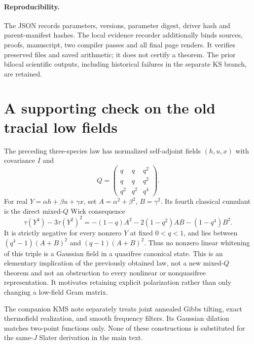 \documentclass[11pt]{article}
\begin{document}
\paragraph{Reproducibility.}
The JSON records parameters, versions, parameter digest, driver hash
and parent-manifest hashes. The local evidence recorder additionally
binds sources, proofs, manuscript, two compiler passes and all final
page renders. It verifies preserved files and saved arithmetic; it
does not certify a theorem. The prior bilocal scientific outputs,
including historical failures in the separate KS branch, are retained.

\newpage
\appendix
\section{A supporting check on the old tracial low fields}
The preceding three-species law has normalized self-adjoint fields
$(h,u,x)$ with covariance $I$ and
\begin{equation}
 Q=\begin{pmatrix}q&q&q^2\\q&q&q^2\\q^2&q^2&q^4\end{pmatrix}.
\end{equation}
For real $Y=\alpha h+\beta u+\gamma x$, set
$A=\alpha^2+\beta^2$, $B=\gamma^2$. Its fourth classical cumulant is
the direct mixed-$Q$ Wick consequence
\begin{equation}\label{cum}
 \tau(Y^4)-3\tau(Y^2)^2
 =-(1-q)A^2-2(1-q^2)AB-(1-q^4)B^2.
\end{equation}
It is strictly negative for every nonzero $Y$ at fixed $0<q<1$,
and lies between $(q^4-1)(A+B)^2$ and $(q-1)(A+B)^2$.
Thus no nonzero linear whitening of this triple is a Gaussian field
in a quasifree canonical state. This is an elementary implication of
the previously obtained law, not a new mixed-$Q$ theorem and not an
obstruction to every nonlinear or nonquasifree representation.
It motivates retaining explicit polarization rather than only
changing a low-field Gram matrix.

The companion KMS note separately treats joint annealed Gibbs
tilting, exact thermofield realization, and smooth frequency filters.
Its Gaussian dilation matches two-point functions only. None of
these constructions is substituted for the same-$J$ Slater derivation
in the main text.
\end{document}
